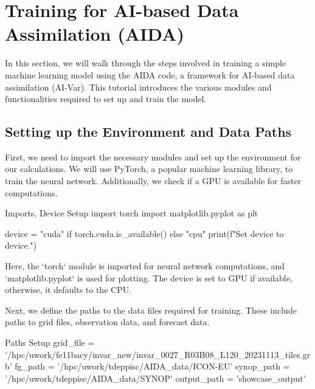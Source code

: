%
\section{Training for AI-based Data Assimilation (AIDA)}

In this section, we will walk through the steps involved in training a simple machine learning model using the AIDA code, a framework for AI-based data assimilation (AI-Var). This tutorial introduces the various modules and functionalities required to set up and train the model.


%
\subsection{Setting up the Environment and Data Paths}

First, we need to import the necessary modules and set up the environment for our calculations. We will use PyTorch, a popular machine learning library, to train the neural network. Additionally, we check if a GPU is available for faster computations.

\begin{codeonly}{Imports, Device Setup}
import torch
import matplotlib.pyplot as plt

device = "cuda" if torch.cuda.is_available() else "cpu"
print(f"Set device to {device}.")
\end{codeonly}

Here, the `torch` module is imported for neural network computations, and `matplotlib.pyplot` is used for plotting. The device is set to GPU if available, otherwise, it defaults to the CPU.

Next, we define the paths to the data files required for training. These include paths to grid files, observation data, and forecast data.

\begin{codeonly}{Paths Setup}
grid_file = '/hpc/uwork/fe11bacy/invar_new/invar_0027_R03B08_L120_20231113_tiles.grb'
fg_path = '/hpc/uwork/tdeppisc/AIDA_data/ICON-EU'
synop_path = '/hpc/uwork/tdeppisc/AIDA_data/SYNOP'
output_path = 'showcase_output'
\end{codeonly}

